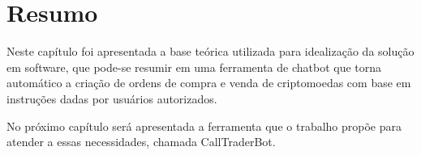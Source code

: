 


\section*{Resumo}
Neste capítulo foi apresentada a base teórica utilizada para idealização da solução em software, que pode-se resumir em uma ferramenta de chatbot que torna automático a criação de ordens de compra e venda de criptomoedas com base em instruções dadas por usuários autorizados.

No próximo capítulo será apresentada a ferramenta que o trabalho propõe para atender a essas necessidades,  chamada CallTraderBot.